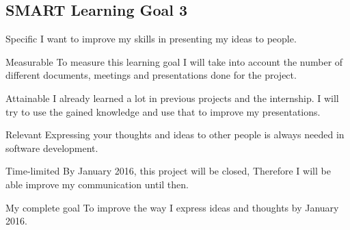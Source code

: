 \documentclass[12pt]{article}
\begin{document}
\subsection{SMART Learning Goal 3}
\begin{SMART}
    \item[Specific] I want to improve my skills in presenting my ideas to people.
    \item[Measurable] To measure this learning goal I will take into account the number of different documents, meetings and presentations done for the project.
    \item[Attainable] I already learned a lot in previous projects and the internship. I will try to use the gained knowledge and use that to improve my presentations.
    \item[Relevant] Expressing your thoughts and ideas to other people is always needed in software development.
    \item[Time-limited] By January 2016, this project will be closed, Therefore I will be able improve my communication until then.
    \item[My complete goal] To improve the way I express ideas and thoughts by January 2016.
\end{SMART}
\end{document}
